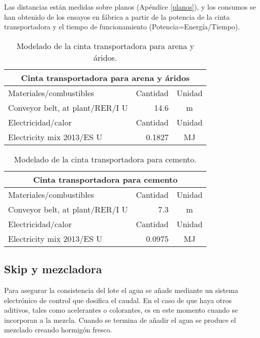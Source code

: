 Las distancias están medidas sobre planos (Apéndice \ref{planos}), y los consumos se han obtenido de los ensayos en fábrica a partir de la potencia de la cinta transportadora y el tiempo de funcionamiento (Potencia=Energía/Tiempo).

\begin{table}[!htb]
\centering
\begin{tabular}{p{8cm}rc}
\toprule
\multicolumn{3}{c}{Cinta transportadora para arena y áridos}\\
\midrule
Materiales/combustibles & Cantidad & Unidad\\
\midrule
Conveyor belt, at plant/RER/I U & 14.6 & \si{m}\\
\midrule
Electricidad/calor & Cantidad & Unidad\\
\midrule
Electricity mix 2013/ES U & 0.1827 & \si{MJ}\\
\bottomrule
\end{tabular}
\caption{Modelado de la cinta transportadora para arena y áridos.}
\label{modeladodecintaarena}
\end{table}

\begin{table}[!htb]
\centering
\begin{tabular}{p{8cm}rc}
\toprule
\multicolumn{3}{c}{Cinta transportadora para cemento}\\
\midrule
Materiales/combustibles & Cantidad & Unidad\\
\midrule
Conveyor belt, at plant/RER/I U & 7.3 & \si{m}\\
\midrule
Electricidad/calor & Cantidad & Unidad\\
\midrule
Electricity mix 2013/ES U & 0.0975 & \si{MJ}\\
\bottomrule
\end{tabular}
\caption{Modelado de la cinta transportadora para cemento.}
\label{modeladodecintacemento}
\end{table}

\subsection{Skip y mezcladora}

Para asegurar la consistencia del lote el agua se añade mediante un sistema electrónico de control que dosifica el caudal. En el caso de que haya otros aditivos, tales como acelerantes o colorantes, es en este momento cuando se incorporan a la mezcla. Cuando se termina de añadir el agua se produce el mezclado creando hormigón fresco.

